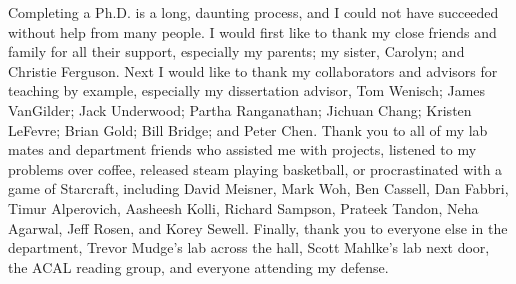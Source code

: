Completing a Ph.D. is a long, daunting process, and I could not have succeeded without help from many people.
I would first like to thank my close friends and family for all their support, especially my parents; my sister, Carolyn; and Christie Ferguson.
Next I would like to thank my collaborators and advisors for teaching by example, especially my dissertation advisor, Tom Wenisch; James VanGilder; Jack Underwood; Partha Ranganathan; Jichuan Chang; Kristen LeFevre; Brian Gold; Bill Bridge; and Peter Chen.
Thank you to all of my lab mates and department friends who assisted me with projects, listened to my problems over coffee, released steam playing basketball, or procrastinated with a game of Starcraft, including David Meisner, Mark Woh, Ben Cassell, Dan Fabbri, Timur Alperovich, Aasheesh Kolli, Richard Sampson, Prateek Tandon, Neha Agarwal, Jeff Rosen, and Korey Sewell.
Finally, thank you to everyone else in the department, Trevor Mudge's lab across the hall, Scott Mahlke's lab next door, the ACAL reading group, and everyone attending my defense.
